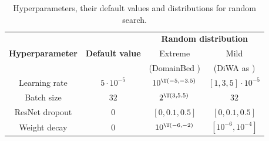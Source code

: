 \begin{table}[H]%
    \centering%
    \caption{Hyperparameters, their default values and distributions for random search.}%
    \begin{tabular}{cccc}%
        \toprule
        \multirow{3}{*}{\textbf{Hyperparameter}} & \multirow{3}{*}{\textbf{Default value}} & \multicolumn{2}{c}{\textbf{Random distribution}} \\
                                                 &                                         & Extreme                  & Mild  \\
                                                 &                                          & (DomainBed \cite{gulrajani2021in}) & (DiWA as \cite{cha2021wad}) \\
        \midrule
        Learning rate                            & $5\cdot 10^{-5}$                        & $10^{\U(-5,-3.5)}$                  & $[1,3,5]\cdot 10^{-5}$         \\
        Batch size                               & $32$                                      & $2^{\U(3,5.5)}$                                  & $32$                             \\
        ResNet dropout                           & $0$                                       & $[0,0.1,0.5]$                                    & $[0, 0.1, 0.5]$                \\
        Weight decay                             & $0$                                       & $10^{\U(-6,-2)}$                                 & $[10^{-6}, 10^{-4}]$           \\
        \bottomrule
    \end{tabular}\label{tab:hyperparam}
\end{table}%
%